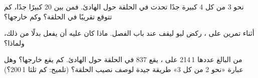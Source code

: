 \begin{exercise}[$\star\star$]\label{exo:g4:volcanoes-earthquakes-first-look:9}
نحو 3 من كل 4  كبيرة جدًا تحدث في الحلقة حول  الهادئ. فمن
بين 20  كبيرًا جدًا، كم  تتوقع تقريبًا في الحلقة؟ وكم
خارجها؟
\end{exercise}

\begin{exercise}[$\star\star$]\label{exo:g4:volcanoes-earthquakes-first-look:10}
أثناء تمرين على ، ركض ليو ليقف عند باب الفصل. ماذا كان عليه أن
يفعل بدلًا من ذلك، ولماذا؟
\end{exercise}

\begin{exercise}[$\star\star\star$]\label{exo:g4:volcanoes-earthquakes-first-look:11}
من  البالغ عددها 1\,214 على ، يقع 837 في الحلقة حول  الهادئ.
كم  يقع خارجها؟ وهل عبارة «نحو 2 من كل 3» طريقة جيدة لوصف
نصيب الحلقة؟ (تلميح: كم ثلثا 1\,200؟)
\end{exercise}
